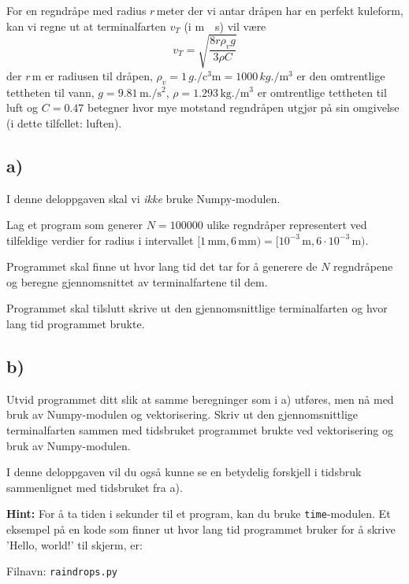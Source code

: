 \documentclass[10pt,a4paper]{article}
\begin{document}
For en regndråpe med radius $r\,$meter der vi antar dråpen har en perfekt kuleform, kan vi regne ut at terminalfarten $v_T$ (i \si{\meter.\per\second}) vil være
\[
v_T = \sqrt{\frac{8r\rho_v g}{3\rho C}}
\]
der $r\,\si{\meter}$ er radiusen til dråpen, $\rho_v = 1\,\si{g.\per\cubic\centi\meter} = 1000 \,\si{kg.\per\cubic\meter}$ er den omtrentlige tettheten til vann, $g = 9.81 \,\si{\meter.\per\square\second}$, $\rho = 1.293 \,\si{\kg.\per\cubic\meter}$ er omtrentlige tettheten til luft og $C = 0.47$ betegner hvor mye motstand regndråpen utgjør på sin omgivelse (i dette tilfellet: luften).
 
\subsection*{a)}
I denne deloppgaven skal vi \textit{ikke} bruke Numpy-modulen.
 
Lag et program som generer $N = 100000$ ulike regndråper representert ved tilfeldige verdier for radius i intervallet $[1\,\si{\milli\meter}, 6\,\si{\milli\meter}) = [10^{-3}\,\si{\meter},6\cdot 10^{-3}\,\si{\meter}) $.
 
 Programmet skal finne ut hvor lang tid det tar for å generere de $N$ regndråpene og beregne gjennomsnittet av terminalfartene til dem. 
 
 Programmet skal tilslutt skrive ut den gjennomsnittlige terminalfarten og hvor lang tid programmet brukte. 
 
 \subsection*{b)}
Utvid programmet ditt slik at samme beregninger som i a) utføres, men nå med bruk av Numpy-modulen og vektorisering. 
Skriv ut den gjennomsnittlige terminalfarten sammen med tidsbruket programmet brukte ved vektorisering og bruk av Numpy-modulen. 
 
I denne deloppgaven vil du også kunne se en betydelig forskjell i tidsbruk sammenlignet med tidsbruket fra a). 
 
\textbf{Hint:} For å ta tiden i sekunder til et program, kan du bruke \texttt{time}-modulen. Et eksempel på en kode som finner ut hvor lang tid programmet bruker for å skrive 'Hello, world!' til skjerm, er:

 
Filnavn: \texttt{raindrops.py}
\end{document}

